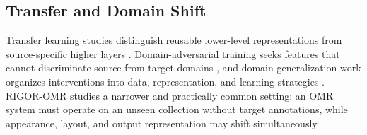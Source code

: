 \subsection{Transfer and Domain Shift}
Transfer learning studies distinguish reusable lower-level representations from source-specific higher layers \cite{pan2010transfer,yosinski2014transferable}. Domain-adversarial training seeks features that cannot discriminate source from target domains \cite{ganin2016domain}, and domain-generalization work organizes interventions into data, representation, and learning strategies \cite{wang2021generalizing}. RIGOR-OMR studies a narrower and practically common setting: an OMR system must operate on an unseen collection without target annotations, while appearance, layout, and output representation may shift simultaneously.
